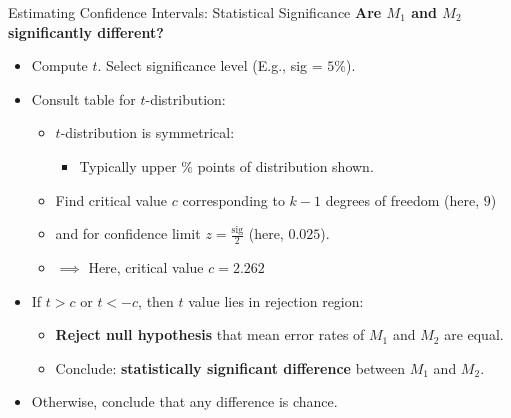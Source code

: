 \begin{frame}{Estimating Confidence Intervals: Statistical Significance}
	\textbf{Are $M_1$ and $M_2$ {\color{airforceblue} significantly different}?}
	\begin{itemize}
		\item Compute $t$. Select significance level (E.g., sig = $5 \%$).
		\item Consult table for $t$-distribution:
		      \begin{itemize}
			      \item $t$-distribution is symmetrical:
			            \begin{itemize}
				            \item Typically upper $\%$ points of distribution shown.
			            \end{itemize}
			      \item Find critical value $c$ corresponding to $k-1$ degrees of freedom (here, $9$)
			      \item and for confidence limit $z = \frac{\text{sig}}{2}$ (here, $0.025$).
			      \item $\implies$ Here, critical value $c = 2.262$
		      \end{itemize}
		\item If $t > c$ or $t < -c$, then $t$ value lies in rejection region:
		      \begin{itemize}
			      \item \textbf{Reject null hypothesis} that mean error rates of $M_1$ and $M_2$ are equal.
			      \item Conclude: \textbf{statistically significant difference} between $M_1$ and $M_2$.
		      \end{itemize}
		\item Otherwise, conclude that any difference is chance.
	\end{itemize}

\end{frame}

